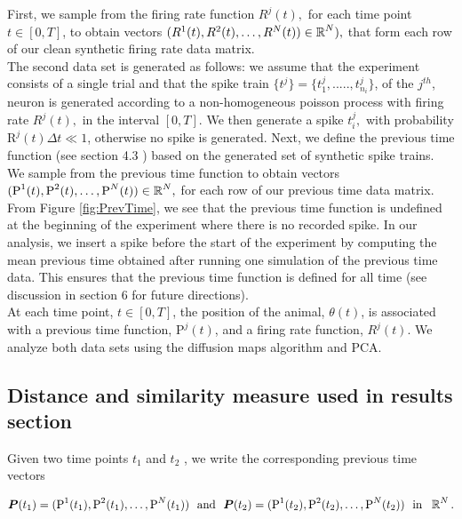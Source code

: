 First, we sample from the firing rate function  $R^{j}(t),$ for each time point $t \in [0, T]$,
to obtain vectors  $(R^{1}(t),  R^{2}(t),    \ldots , R^{N}(t) )  \in \operatorname{\mathbb{R}}^N),$ that form each row of our  
clean synthetic firing rate data  matrix.\\


The second data set is generated as follows: we assume that the experiment consists of a single trial and that the spike train  $\{ t^j \}   =  \{t_{1}^{j}, ....., t_{n_{i}}^{j} \} $, of the $j^{th}$, neuron is generated according to a non-homogeneous poisson process with firing rate  $R^{j}(t),$ in the interval $[0, T].$ We then generate a spike  $t^j_i,$ with probability $\text{R}^{j}(t)\Delta t \ll 1$, otherwise no spike is generated.  Next, we define the previous time function (see section 4.3 )  based on the  generated set of synthetic spike trains.  We sample from the previous time function to obtain  vectors
$( \text{P}^{1}(t), \text{P}^{2}(t), \ldots, \text{P}^{N}(t) ) \in  \operatorname{\mathbb{R}}^N,$ for each row of our previous time data matrix.\\

From Figure \ref{fig:PrevTime}, we  see that the previous time function is undefined at the beginning of the experiment where there is no recorded spike. In our analysis, we insert a spike before the start of the experiment by computing the mean previous time obtained after running  one simulation of  the previous time data. This ensures that the previous time function
is defined for all time (see discussion in section 6 for future directions). \\

At  each time point, $t  \in [0,T]$, the position of the animal, $\theta(t)$, is associated with a previous time function, $\text{P}^{j}(t)$, and a firing rate function, $R^{j}(t)$. We analyze both data sets using the diffusion maps algorithm  and  PCA.


\subsection{Distance  and similarity measure used in results section}
Given two time points $t_{1}$ and $t_{2}$ , we write the corresponding previous time vectors 

$$ \vect{P}(t_1)= (\text{P}^{1}(t_{1}), \text{P}^{2}(t_{1}), \ldots, \text{P}^{N}(t_{1}))   \  \ \text{and} \  \ 
 \vect{P}(t_{2}) = (\text{P}^{1}(t_{2}), \text{P}^{2}(t_{2}), \ldots, \text{P}^{N}(t_{2}))  \  \ \text{in} \  \  \R^{N}.$$

